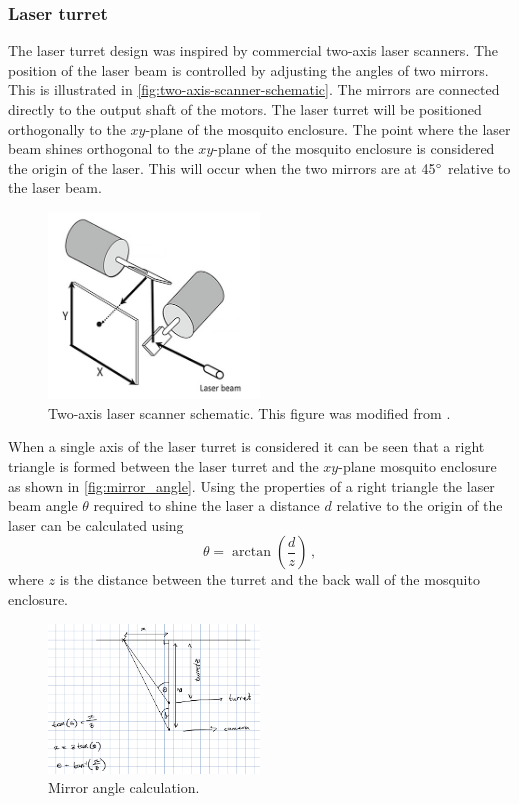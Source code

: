 \subsubsection{Laser turret}\label{subsubsec:laser_turret_design}
The laser turret design was inspired by commercial two-axis laser scanners. The position of the laser beam is controlled by adjusting the angles of two mirrors. This is illustrated in \autoref{fig:two-axis-scanner-schematic}. The mirrors are connected directly to the output shaft of the motors. The laser turret will be positioned orthogonally to the $xy$-plane of the mosquito enclosure. The point where the laser beam shines orthogonal to the $xy$-plane of the mosquito enclosure is considered the origin of the laser. This will occur when the two mirrors are at 45$^{\circ}$ relative to the laser beam.
\begin{figure}[h]
    \centering
    \includegraphics[width=0.5\textwidth]{figures/hardware_design/two_axis_scanner.png}
    \caption{Two-axis laser scanner schematic. This figure was modified from \cite{two-axis-scanner-schematic}.}
    \label{fig:two-axis-scanner-schematic}
\end{figure}

When a single axis of the laser turret is considered it can be seen that a right triangle is formed between the laser turret and the $xy$-plane mosquito enclosure as shown in \autoref{fig:mirror_angle}. Using the properties of a right triangle the laser beam angle $\theta$ required to shine the laser a distance $d$ relative to the origin of the laser can be calculated using
\begin{equation}
    \theta = \arctan{\left(\frac{d}{z}\right)}\,,
    \label{eq:mirror_angle}
\end{equation}
where $z$ is the distance between the turret and the back wall of the mosquito enclosure.
\begin{figure}[h]
    \centering
    \includegraphics[width=0.5\textwidth]{figures/hardware_design/mirror_angle.png}
    \caption{Mirror angle calculation.}
    \label{fig:mirror_angle}
\end{figure}

